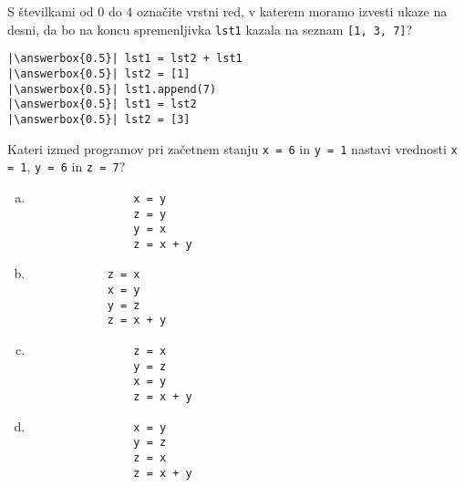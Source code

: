 \documentclass[arhiv, 10pt]{../izpit}
\newcommand{\inlinepy}[1]{\texttt{#1}}
\newcommand{\answerbox}[1]{\framebox{\vphantom{\large M}\hspace{#1cm}}}
\begin{document}
        \naloga*
        \begin{multicols}{2}
        \noindent 
        S številkami od $0$ do $4$ označite vrstni red, v katerem moramo izvesti ukaze na desni, da bo na koncu spremenljivka \inlinepy{lst1} kazala na seznam \inlinepy{[1, 3, 7]}?
    
        \columnbreak
        \noindent
        \begin{verbatim}
|\answerbox{0.5}| lst1 = lst2 + lst1
|\answerbox{0.5}| lst2 = [1]
|\answerbox{0.5}| lst1.append(7)
|\answerbox{0.5}| lst1 = lst2
|\answerbox{0.5}| lst2 = [3]

        \end{verbatim}
        \end{multicols}
    
            
        \naloga*
        
        Kateri izmed programov pri začetnem stanju
            \inlinepy{x = 6} in
            \inlinepy{y = 1}
        nastavi vrednosti
            \inlinepy{x = 1},
            \inlinepy{y = 6} in
            \inlinepy{z = 7}?
    
        \begin{multicols}{4}
        \begin{enumerate}[(a)]
\item 
                \begin{verbatim}
                x = y
                z = y
                y = x
                z = x + y
                \end{verbatim}
            
\item 
            \begin{verbatim}
            z = x
            x = y
            y = z
            z = x + y
            \end{verbatim}
        
\item 
                \begin{verbatim}
                z = x
                y = z
                x = y
                z = x + y
                \end{verbatim}
            
\item 
                \begin{verbatim}
                x = y
                y = z
                z = x
                z = x + y
                \end{verbatim}
            
\end{enumerate}

        \end{multicols}
    
\end{document}
